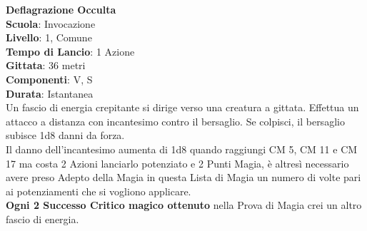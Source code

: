 \begin{multicols}{2}
\medskip\textbf{Deflagrazione Occulta}\\
\textbf{Scuola}: Invocazione\\
\textbf{Livello}: 1, Comune\\
\textbf{Tempo di Lancio}: 1 Azione\\
\textbf{Gittata}: 36 metri\\
\textbf{Componenti}: V, S\\
\textbf{Durata}: Istantanea\\
Un fascio di energia crepitante si dirige verso una creatura a gittata. Effettua un attacco a distanza con incantesimo contro il bersaglio. Se colpisci, il bersaglio subisce 1d8 danni da forza.\\
Il danno dell'incantesimo aumenta di 1d8 quando raggiungi CM 5, CM 11 e CM 17 ma costa 2 Azioni lanciarlo potenziato e 2 Punti Magia, è altresì necessario avere preso Adepto della Magia in questa Lista di Magia un numero di volte pari ai potenziamenti che si vogliono applicare.\\
\textbf{Ogni 2 Successo Critico magico ottenuto} nella Prova di Magia crei un altro fascio di energia.


\end{multicols}
